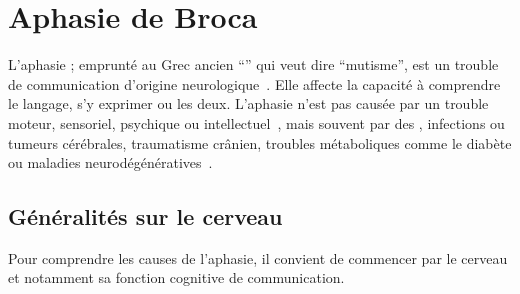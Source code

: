 \chapter{Aphasie de Broca}
\newcommand{\greekaphasia}{\textalpha\textphi\textalpha\textsigma\textiota\textalpha }

L'aphasie ; emprunté au Grec ancien ``\greekaphasia'' qui veut dire ``mutisme'',
est un trouble de communication d'origine neurologique~\cite{Larousse}. 
Elle affecte la capacité à comprendre le langage, s'y exprimer ou les deux.
L'aphasie n'est pas causée par un trouble moteur, sensoriel, psychique ou intellectuel~\cite{Chapey_2008},
mais souvent par des , infections ou tumeurs cérébrales, traumatisme crânien, 
troubles métaboliques comme le diabète ou maladies neurodégénératives~\cite{Hallowell_2017}.

\section{Généralités sur le cerveau}

Pour comprendre les causes de l'aphasie, 
il convient de commencer par le cerveau et notamment sa fonction cognitive de communication.